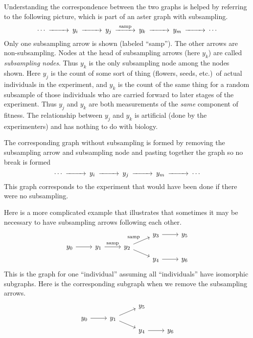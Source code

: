 Understanding the correspondence between the two graphs is helped by
referring to the following picture, which is part of an aster graph
with subsampling.
\begin{equation} \label{graph:with}
\begin{CD}
   \cdots @>>> y_i @>>> y_j @>\text{samp}>> y_k @>>> y_m @>>> \cdots
\end{CD}
\end{equation}
Only one subsampling arrow is shown (labeled ``samp'').  The other arrows
are non-subsampling.  Nodes at the head of subsampling arrows (here $y_k$)
are called \emph{subsampling nodes}.  Thus $y_k$ is the only subsampling node
among the nodes shown.
Here $y_j$ is the count of some
sort of thing (flowers, seeds, etc.)\ of actual individuals in the experiment,
and $y_k$ is the count of the same thing for a random subsample of those
individuals who are
carried forward to later stages of the experiment.
Thus $y_j$ and $y_k$ are both measurements of
the \emph{same} component of fitness.
The relationship between
$y_j$ and $y_k$ is artificial (done by the experimenters) and has nothing
to do with biology.

The corresponding graph without subsampling is formed by removing the
subsampling arrow and subsampling node and pasting together the graph
so no break is formed
\begin{equation} \label{graph:without}
\begin{CD}
   \cdots @>>> y_i @>>> y_j @>>> y_m @>>> \cdots
\end{CD}
\end{equation}
This graph corresponds to the experiment that would have been done if there
were no subsampling.

Here is a more complicated example that illustrates that sometimes
it may be necessary to have subsampling arrows following each other.
\begin{equation} \label{graph:with-with}
\begin{tikzcd}[row sep=tiny]
   \hphantom{y_0} & \hphantom{y_1} & \hphantom{y_2} & y_3 \arrow{r} & y_5
   \\
   y_0 \arrow{r} & y_1 \arrow{r}{\text{samp}}
   & y_2 \arrow{ru}{\text{samp}} \arrow{rd}
   \\
   \hphantom{y_0} & \hphantom{y_1} & \hphantom{y_2} & y_4 \arrow{r} & y_6
\end{tikzcd}
\end{equation}
This is the graph for one ``individual'' assuming all ``individuals'' have
isomorphic subgraphs.
Here is the corresponding subgraph when we remove the subsampling arrows.
\begin{equation} \label{graph:with-with-stripped}
\begin{tikzcd}[row sep=tiny]
   \hphantom{y_0} & \hphantom{y_1} & y_5
   \\
   y_0 \arrow{r} & y_1 \arrow{ru} \arrow{rd}
   \\
   \hphantom{y_0} & \hphantom{y_1} & y_4 \arrow{r} & y_6
\end{tikzcd}
\end{equation}

